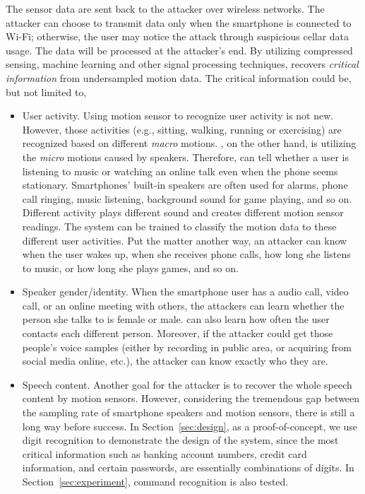 The sensor data are sent back to the attacker over wireless networks. The attacker can choose to transmit data only when the smartphone is connected to Wi-Fi; otherwise, the user may notice the attack through suspicious cellar data usage. The data will be processed at the attacker's end. By utilizing compressed sensing, machine learning and other signal processing techniques, {\systemName} recovers \textit{critical information} from undersampled motion data.
%
The critical information could be, but not limited to,
\begin{itemize}
	\item
	User activity. Using motion sensor to recognize user activity is not new. However, those activities (e.g., sitting, walking, running or exercising)  are recognized based on different \textit{macro} motions. {\systemName}, on the other hand, is utilizing the \textit{micro} motions caused by speakers. Therefore, {\systemName} can tell whether a user is listening to music or watching an online talk even when the phone seems stationary. Smartphones' built-in speakers are often used for alarms, phone call ringing, music listening, background sound for game playing, and so on. Different activity plays different sound and creates different motion sensor readings. The {\systemName} system can be trained to classify the motion data to these different user activities. Put the matter another way, an attacker can know when the user wakes up, when she receives phone calls, how long she listens to music, or how long she plays games, and so on.
	\item 
	Speaker gender/identity. When the smartphone user has a audio call, video call, or an online meeting with others, the {\attackName} attackers can learn whether the person she talks to is female or male. {\systemName} can also learn how often the user contacts each different person. Moreover, if the attacker could get those people's voice samples (either by recording in public area, or acquiring from social media online, etc.), the attacker can know exactly who they are.
	\item
	Speech content. Another goal for the attacker is to recover the whole speech content by motion sensors. However, considering the tremendous gap between the sampling rate of smartphone speakers and motion sensors, there is still a long way before success. In Section~\ref{sec:design}, as a proof-of-concept, we use digit recognition to demonstrate the design of the {\systemName} system, since the most critical information such as  banking account numbers, credit card information, and certain passwords,  are essentially combinations of digits. In Section~\ref{sec:experiment}, command recognition is also tested.
\end{itemize}

